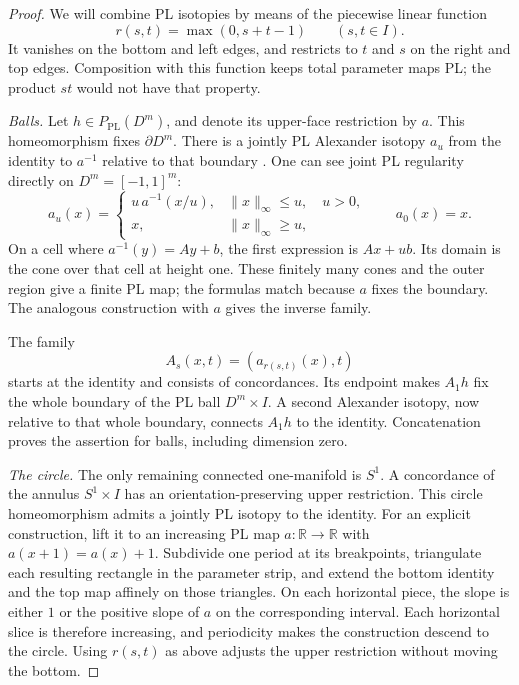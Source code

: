 \begin{proof}
We will combine PL isotopies by means of the piecewise linear function
\[
              r(s,t)=\max(0,s+t-1)\qquad(s,t\in I).
\]
It vanishes on the bottom and left edges, and restricts to $t$ and $s$
on the right and top edges.  Composition with this function keeps total
parameter maps PL; the product $st$ would not have that property.

\emph{Balls.}
Let $h\in P_{\mathrm{PL}}(D^m)$, and denote its upper-face restriction
by $a$.  This homeomorphism fixes $\partial D^m$.  There is a jointly
PL Alexander isotopy $a_u$ from the identity to $a^{-1}$ relative to
that boundary \cite[Theorem~5.2, pp.~95--96]{Epstein1966}.
One can see joint PL regularity directly on $D^m=[-1,1]^m$:
\[
 a_u(x)=
 \begin{cases}
  u\,a^{-1}(x/u),&\lVert x\rVert_\infty\leq u,\quad u>0,\\
  x,&\lVert x\rVert_\infty\geq u,
 \end{cases}
 \qquad a_0(x)=x.
\]
On a cell where $a^{-1}(y)=Ay+b$, the first expression is $Ax+ub$.
Its domain is the cone over that cell at height one.  These finitely
many cones and the outer region give a finite PL map; the formulas
match because $a$ fixes the boundary.  The analogous construction with
$a$ gives the inverse family.

The family
\[
              A_s(x,t)=(a_{r(s,t)}(x),t)
\]
starts at the identity and consists of concordances.  Its endpoint
makes $A_1h$ fix the whole boundary of the PL ball $D^m\times I$.
A second Alexander isotopy, now relative to that whole boundary,
connects $A_1h$ to the identity.  Concatenation proves the assertion for
balls, including dimension zero.

\emph{The circle.}
The only remaining connected one-manifold is $S^1$.  A concordance
of the annulus $S^1\times I$ has an orientation-preserving upper
restriction.  This circle homeomorphism admits a jointly PL isotopy
to the identity.  For an explicit construction, lift it to an
increasing PL map $a:\mathbb R\to\mathbb R$ with
$a(x+1)=a(x)+1$.  Subdivide one period at its breakpoints, triangulate
each resulting rectangle in the parameter strip, and extend the
bottom identity and the top map affinely on those triangles.  On each
horizontal piece, the slope is either $1$ or the positive slope of
$a$ on the corresponding interval.  Each horizontal slice is therefore
increasing, and periodicity makes the construction descend to the
circle.  Using $r(s,t)$ as above adjusts the upper restriction without
moving the bottom.


\end{proof}
